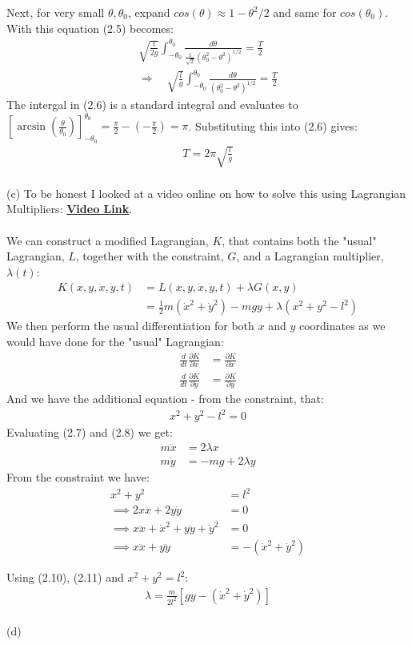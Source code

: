 \documentclass[12pt]{article}
\begin{document}
\newpage
\noindent
Next, for very small $\theta, \theta_0$, expand $cos(\theta) \approx 1 - \theta^2/2$ and same for $cos(\theta_0)$.  With this equation (2.5)
becomes:
\begin{align*}
\sqrt{\frac{l}{2g}}\int_{-\theta_0}^{\theta_0}
\frac{d\theta}{\frac{1}{\sqrt{2}}\left(\theta_0^2-\theta^2\right)^{1/2}}
=\frac{T}{2} \\
\Rightarrow\quad \sqrt{\frac{l}{g}}\int_{-\theta_0}^{\theta_0}
\frac{d\theta}{\left(\theta_0^2-\theta^2\right)^{1/2}} \tag{2.6}
=\frac{T}{2}
\end{align*}
The intergal in (2.6) is a standard integral and evaluates to $\left[\arcsin(\frac{\theta}{\theta_0}) \right]_{-\theta_0}^{\theta_0} = \frac{\pi}{2} - (-\frac{\pi}{2}) = \pi$.
Substituting this into (2.6) gives:
\begin{align*}
T = 2\pi\sqrt{\frac{l}{g}}
\end{align*}
\\
(c) To be honest I looked at a video online on how to solve this using Lagrangian Multipliers:
\href{https://www.youtube.com/watch?v=keMzpa_iWjs&t=809s}{\textbf{Video Link}}.\\
\\
We can construct a modified Lagrangian, $K$, that contains both the "usual" Lagrangian, $L$, together with the
constraint, $G$, and a Lagrangian multiplier, $\lambda(t)$:
\begin{align*}
K(x,y,\dot{x},\dot{y}, t) &= L(x,y,\dot{x},\dot{y}, t) + \lambda G(x,y) \\
&= \frac{1}{2}m(\dot{x}^2 + \dot{y}^2) - mgy + \lambda(x^2 + y^2 -l^2)
\end{align*}
We then perform the usual differentiation for both $x$ and $y$ coordinates as we would have
done for the "usual" Lagrangian:
\begin{align*}
 \frac{d}{dt}\frac{\partial K}{\partial \dot{x}} &= \frac{\partial K}{\partial x} \tag{2.7}\\
 \frac{d}{dt}\frac{\partial K}{\partial \dot{y}} &= \frac{\partial K}{\partial y} \tag{2.8}
\end{align*}
And we have the additional equation - from the constraint, that:
\begin{align*}
 x^2 + y^2 - l^2 = 0 \tag{2.9}
\end{align*}
Evaluating (2.7) and (2.8) we get:
\begin{align*}
m\ddot{x} &= 2\lambda x \tag{2.10}\\
m\ddot{y} &= -mg+2\lambda y \tag{2.11}
\end{align*}
From the constraint we have:
\begin{align*}
x^2 + y^2 &= l^2 \\
\implies 2x\dot{x} + 2y\dot{y} &= 0 \\ 
\implies x\ddot{x} + \dot{x}^2 + y\ddot{y} + \dot{y}^2 &= 0 \\ 
\implies x\ddot{x} + y\ddot{y} &= -(\dot{x}^2 + \dot{y}^2)
\end{align*}

\newpage
\noindent
Using (2.10), (2.11) and $x^2 + y^2 = l^2$:
\begin{align*}
\lambda = \frac{m}{2 l^2}[gy - (\dot{x}^2 + \dot{y}^2)] \tag{2.12}
\end{align*}
\\
(d)
\end{document}
